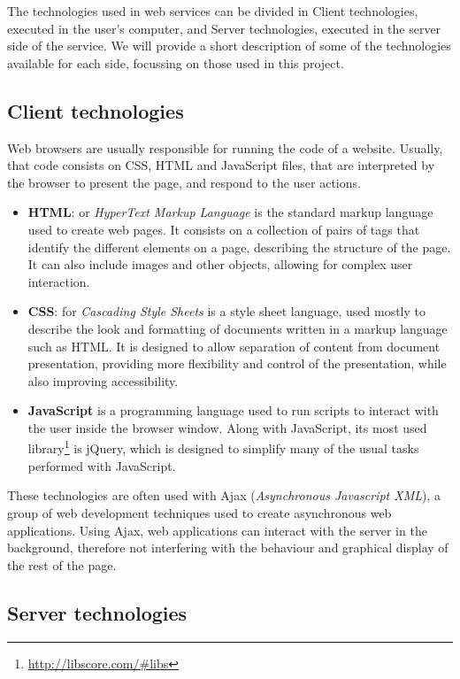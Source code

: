 The technologies used in web services can be divided in Client technologies, executed in the user's computer, and Server technologies, executed in the server side of the service. We will provide a short description of some of the technologies available for each side, focussing on those used in this project.

\subsection{Client technologies}

Web browsers are usually responsible for running the code of a website. Usually, that code consists on CSS, HTML and JavaScript files, that are interpreted by the browser to present the page, and respond to the user actions.

\begin{itemize}
  \item \textbf{HTML}: or \emph{HyperText Markup Language} is the standard markup language used to create web pages. It consists on a collection of pairs of tags that identify the different elements on a page, describing the structure of the page. It can also include images and other objects, allowing for complex user interaction.
  \item \textbf{CSS}: for \emph{Cascading Style Sheets} is a style sheet language, used mostly to describe the look and formatting of documents written in a markup language such as HTML. It is designed to allow separation of content from document presentation, providing more flexibility and control of the presentation, while also improving accessibility.
  \item \textbf{JavaScript} is a programming language used to run scripts to interact with the user inside the browser window. Along with JavaScript, its most used library\footnote{\url{http://libscore.com/\#libs}} is jQuery, which is designed to simplify many of the usual tasks performed with JavaScript.
\end{itemize}

These technologies are often used with Ajax (\emph{Asynchronous Javascript XML}), a group of web development techniques used to create asynchronous web applications. Using Ajax, web applications can interact with the server in the background, therefore not interfering with the behaviour and graphical display of the rest of the page.


\subsection{Server technologies}

